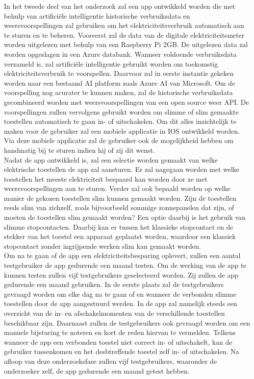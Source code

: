 \documentclass{hogent-article}
\begin{document}
In het tweede deel van het onderzoek zal een app ontwikkeld worden die met behulp van artificiële intelligentie historische verbruiksdata en weersvoorspellingen zal gebruiken om het elektriciteitsverbruik automatisch aan te sturen en te beheren. Vooreerst zal de data van de digitale elektriciteitsmeter worden uitgelezen met behulp van een Raspberry Pi 2GB. De uitgelezen data zal worden opgeslagen in een Azure databank. Wanneer voldoende verbruiksdata verzameld is, zal artificiële intelligentie gebruikt worden om toekomstig elektriciteitsverbruik te voorspellen. Daarvoor zal in eerste instantie gekeken worden naar een bestaand AI platform zoals Azure AI van Microsoft. Om de voorspelling nog acurater te kunnen maken, zal de historische verbruiksdata gecombineerd worden met weersvoorspellingen van een open source weer API. De voorspellingen zullen vervolgens gebruikt worden om slimme of slim gemaakte toestellen automatisch te gaan in- of uitschakelen. Om dit alles inzichtelijk te maken voor de gebruiker zal een mobiele applicatie in IOS ontwikkeld worden. Via deze mobiele applicatie zal de gebruiker ook de mogelijkheid hebben om handmatig bij te sturen indien hij of zij dit wenst. \\

Nadat de app ontwikkeld is, zal een selectie worden gemaakt van welke elektrische toestellen de app zal aansturen. Er zal nagegaan worden met welke toestellen het meeste elektriciteit bespaard kan worden door ze met weersvoorspellingen aan te sturen. Verder zal ook bepaald worden op welke manier de gekozen toestellen slim kunnen gemaakt worden. Zijn de toestellen reeds slim van zichzelf, zoals bijvoorbeeld sommige zonnepanelen dat zijn, of moeten de toestellen slim gemaakt worden? Een optie daarbij is het gebruik van slimme stopcontacten. Daarbij kan er tussen het klassieke stopcontact en de stekker van het toestel een apparaat geplaatst worden, waardoor een klassiek stopcontact zonder ingrijpende werken slim kan gemaakt worden. \\

Om na te gaan of de app een elektriciteitsbesparing oplevert, zullen een aantal testgebruiker de app gedurende een maand testen. Om de werking van de app te kunnen testen zullen vijf testgebruikers geselecteerd worden. Zij zullen de app gedurende een maand gebruiken. In de eerste plaats zal de testgebruikers gevraagd worden om elke dag na te gaan of en wanneer de verbonden slimme toestellen door de app aangestuurd werden. In de app zal namelijk steeds een overzicht van de in- en afschakelmomenten van de verschillende toestellen beschikbaar zijn. Daarnaast zullen de testgebruikers ook gevraagd worden om een manuele bijsturing te noteren en kort de reden hiervan te vermelden. Telkens wanneer de app een verbonden toestel niet correct in- of uitschakelt, kan de gebruiker tussenkomen en het desbtreffende toestel zelf in- of uitschakelen. Na afloop van deze onderzoeksfase zullen vijf testgebruikers, waaronder de onderzoeker zelf, de app gedurende een maand getest hebben. \\
\end{document}
